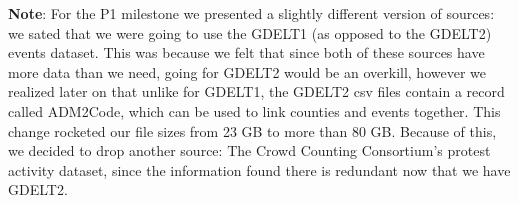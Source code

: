 \textbf{Note}: For the P1 milestone we presented a slightly
different version of sources: we sated that we were going to use
the GDELT1 (as opposed to the GDELT2) events dataset.
This was because we felt that since both of these sources have
more data than we need, going for GDELT2 would be an overkill,
however we realized later on that unlike for GDELT1,
the GDELT2 csv files contain a record called ADM2Code,
which can be used to link counties and events together.
This change rocketed our file sizes from 23 GB to more than
80 GB. Because of this, we decided to drop another source:
The Crowd Counting Consortium's protest activity dataset, since
the information found there is redundant now that we have
GDELT2.

